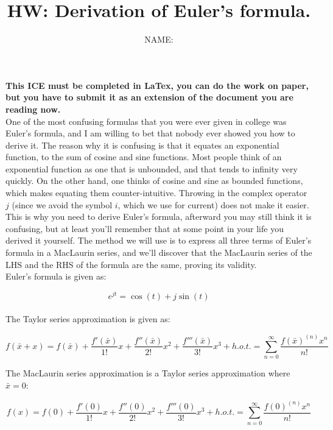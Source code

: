 \documentclass[11pt,letterpaper]{article}
\author{NAME:}
\title{HW: Derivation of Euler's formula.}
\begin{document}
\maketitle

\textbf{This ICE must be completed in LaTex, you can do the work on paper, but you have to submit it as an extension of the document you are reading now.}\\
One of the most confusing formulas that you were ever given in college was Euler's formula, and I am willing to bet that nobody ever showed you how to derive it. The reason why it is confusing is that it equates an exponential function, to the sum of cosine and sine functions. Most people think of an exponential function as one that is unbounded, and that tends to infinity very quickly. On the other hand, one thinks of cosine and sine as bounded functions, which makes equating them counter-intuitive. Throwing in the complex operator $j$ (since we avoid the symbol $i$, which we use for current) does not make it easier.\\
This is why you need to derive Euler's formula, afterward you may still think it is confusing, but at least you'll remember that at some point in your life you derived it yourself. The method we will use is to express all three terms of Euler's formula in a MacLaurin series, and we'll discover that the MacLaurin series of the LHS and the RHS of the formula are the same, proving its validity.\\

Euler's formula is given as:

\begin{equation}
e^{jt} = \cos(t) + j \sin(t)
\end{equation}
\\
The Taylor series approximation is given as:

\begin{equation}\label{Eqn:InClassEuler1}
f(\bar{x} +x) =f(\bar{x}) + \dfrac{f'(\bar{x})}{1!}x + \dfrac{f''(\bar{x})}{2!}x^2 + \dfrac{f'''(\bar{x})}{3!}x^3 +h.o.t.  = \sum_{n=0}^{\infty}\dfrac{f(\bar{x} )^{(n)}x^n}{n!}
\end{equation}

The MacLaurin series approximation is a Taylor series approximation where $\bar{x} = 0$: 

\begin{equation}\label{Eqn:InClassEuler2}
f(x) =f(0) + \dfrac{f'(0)}{1!}x + \dfrac{f''(0)}{2!}x^2 + \dfrac{f'''(0)}{3!}x^3 + h.o.t.  =\sum_{n=0}^{\infty}\dfrac{f(0)^{(n)}x^n}{n!}
\end{equation}
\end{document}
